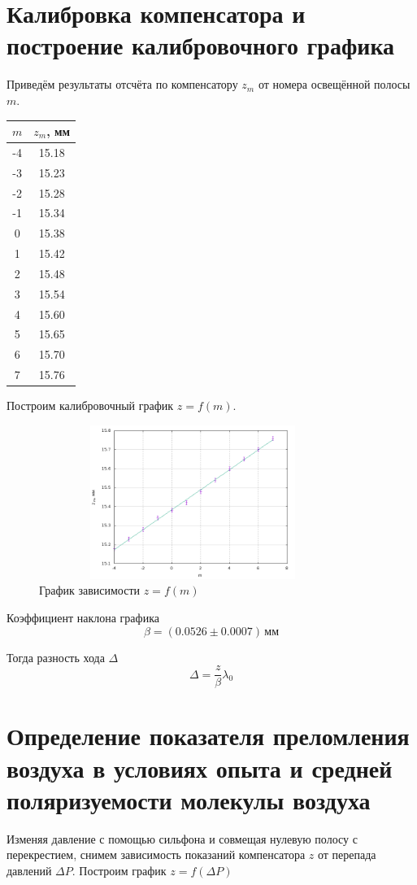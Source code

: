 \documentclass[12pt]{article}
\begin{document}
\section*{Калибровка компенсатора и построение калибровочного графика}
\par
	Приведём результаты отсчёта по компенсатору $z_m$ от номера освещённой полосы $m$.
\begin{table}[h!]
	\centering
	\begin{tabular}{|c|c|}
	\hline
		$m$ & $z_m$, мм \\
	\hline
		-4 & 15.18 \\
	\hline
		-3 & 15.23 \\
	\hline
		-2 & 15.28 \\
	\hline
		-1 & 15.34 \\
	\hline
		0 & 15.38 \\
	\hline
		1 & 15.42 \\
	\hline
		2 & 15.48 \\
	\hline
		3 & 15.54 \\
	\hline
		4 & 15.60 \\
	\hline
		5 & 15.65 \\
	\hline
		6 & 15.70 \\
	\hline
		7 & 15.76 \\ 
	\hline
	\end{tabular}	
\end{table}
\par
	Построим калибровочный график $z = f(m)$.
\begin{figure}[h!]
	\centering
	\includegraphics[width = 10cm, height = 5cm]{plot1.png}
	\caption{График зависимости $z = f(m)$}
\end{figure}
\par
	Коэффициент наклона графика
\[
	\beta = \left(0.0526 \pm 0.0007 \right) \, \text{мм}
\]
\par
	Тогда разность хода $\Delta$
\[
	\Delta = \frac{z}{\beta} \lambda_0
\]

\section*{Определение показателя преломления воздуха в условиях опыта и средней поляризуемости молекулы воздуха}
\par
	Изменяя давление с помощью сильфона и совмещая нулевую полосу с перекрестием, снимем зависимость показаний компенсатора $z$ от перепада давлений $\Delta P$. Построим график $z = f(\Delta P)$
	
\end{document}
